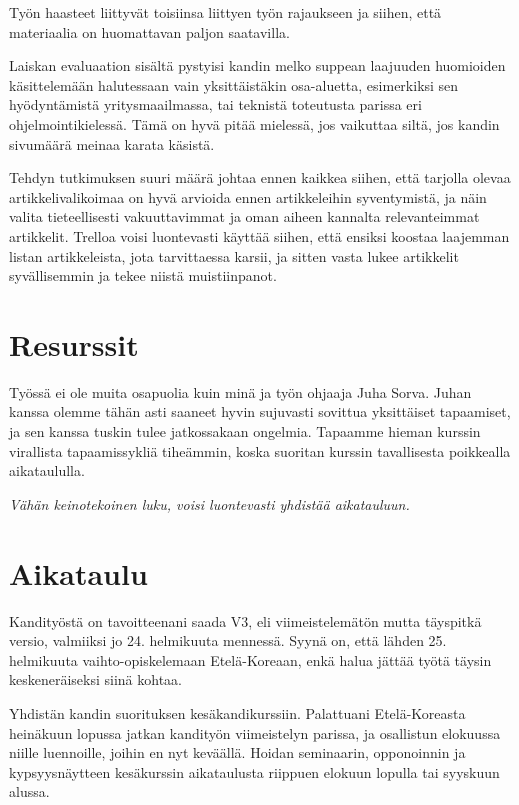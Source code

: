 \documentclass[12pt,a4paper,finnish,oneside]{article}
\begin{document}
Työn haasteet liittyvät toisiinsa liittyen työn rajaukseen ja siihen, että materiaalia on huomattavan paljon saatavilla.

Laiskan evaluaation sisältä pystyisi kandin melko suppean laajuuden huomioiden käsittelemään halutessaan vain yksittäistäkin osa-aluetta, esimerkiksi sen hyödyntämistä yritysmaailmassa, tai teknistä toteutusta parissa eri ohjelmointikielessä. Tämä on hyvä pitää mielessä, jos vaikuttaa siltä, jos kandin sivumäärä meinaa karata käsistä.

Tehdyn tutkimuksen suuri määrä johtaa ennen kaikkea siihen, että tarjolla olevaa artikkelivalikoimaa on hyvä arvioida ennen artikkeleihin syventymistä, ja näin valita tieteellisesti vakuuttavimmat ja oman aiheen kannalta relevanteimmat artikkelit. Trelloa voisi luontevasti käyttää siihen, että ensiksi koostaa laajemman listan artikkeleista, jota tarvittaessa karsii, ja sitten vasta lukee artikkelit syvällisemmin ja tekee niistä muistiinpanot.

\section{Resurssit}

Työssä ei ole muita osapuolia kuin minä ja työn ohjaaja Juha Sorva. Juhan kanssa olemme tähän asti saaneet hyvin sujuvasti sovittua yksittäiset tapaamiset, ja sen kanssa tuskin tulee jatkossakaan ongelmia. Tapaamme hieman kurssin virallista tapaamissykliä tiheämmin, koska suoritan kurssin tavallisesta poikkealla aikataululla.

\emph{Vähän keinotekoinen luku, voisi luontevasti yhdistää aikatauluun.}

\section{Aikataulu}

Kandityöstä on tavoitteenani saada V3, eli viimeistelemätön mutta täyspitkä versio, valmiiksi jo 24. helmikuuta mennessä. Syynä on, että lähden 25. helmikuuta vaihto-opiskelemaan Etelä-Koreaan, enkä halua jättää työtä täysin keskeneräiseksi siinä kohtaa.

Yhdistän kandin suorituksen kesäkandikurssiin. Palattuani Etelä-Koreasta heinäkuun lopussa jatkan kandityön viimeistelyn parissa, ja osallistun elokuussa niille luennoille, joihin en nyt keväällä. Hoidan seminaarin, opponoinnin ja kypsyysnäytteen kesäkurssin aikataulusta riippuen elokuun lopulla tai syyskuun alussa.
\end{document}
